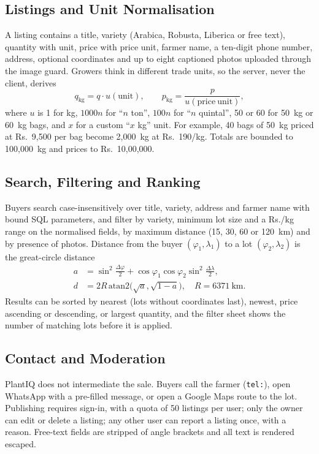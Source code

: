 \subsection{Listings and Unit Normalisation}
A listing contains a title, variety (Arabica, Robusta, Liberica or free text), quantity with unit, price with price
unit, farmer name, a ten-digit phone number, address, optional coordinates and up to eight captioned photos uploaded
through the image guard. Growers think in different trade units, so the server, never the client, derives
\begin{equation}
q_{\mathrm{kg}} = q\cdot u(\mathrm{unit}),\qquad p_{\mathrm{kg}} = \frac{p}{u(\mathrm{price\ unit})},
\end{equation}
where $u$ is 1 for kg, $1000n$ for ``$n$ ton'', $100n$ for ``$n$ quintal'', 50 or 60 for 50~kg or 60~kg bags, and $x$
for a custom ``$x$ kg'' unit. For example, 40 bags of 50~kg priced at Rs.~9{,}500 per bag become 2{,}000~kg at
Rs.~190/kg. Totals are bounded to 100{,}000~kg and prices to Rs.~10{,}00{,}000.

\subsection{Search, Filtering and Ranking}
Buyers search case-insensitively over title, variety, address and farmer name with bound SQL parameters, and filter by
variety, minimum lot size and a Rs./kg range on the normalised fields, by maximum distance (15, 30, 60 or 120~km) and
by presence of photos. Distance from the buyer $(\varphi_1,\lambda_1)$ to a lot $(\varphi_2,\lambda_2)$ is the
great-circle distance
\begin{align}
a &= \sin^2\!\tfrac{\Delta\varphi}{2}+\cos\varphi_1\cos\varphi_2\sin^2\!\tfrac{\Delta\lambda}{2},\\
d &= 2R\,\mathrm{atan2}\big(\sqrt{a},\sqrt{1-a}\big),\quad R=6371\ \mathrm{km}.
\end{align}
Results can be sorted by nearest (lots without coordinates last), newest, price ascending or descending, or largest
quantity, and the filter sheet shows the number of matching lots before it is applied.

\subsection{Contact and Moderation}
PlantIQ does not intermediate the sale. Buyers call the farmer (\texttt{tel:}), open WhatsApp with a pre-filled message,
or open a Google Maps route to the lot. Publishing requires sign-in, with a quota of 50 listings per user; only the owner
can edit or delete a listing; any other user can report a listing once, with a reason. Free-text fields are stripped of
angle brackets and all text is rendered escaped.

